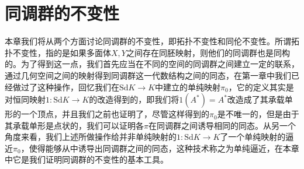 \chapter{同调群的不变性}
本章我们将从两个方面讨论同调群的不变性，即拓扑不变性和同伦不变性。所谓拓扑不变性，指的是如果多面体$X,Y$之间存在同胚映射，则他们的同调群也是同构的。为了得到这一点，我们首先应当在不同的空间的同调群之间建立一定的联系，通过几何空间之间的映射得到同调群这一代数结构之间的同态，在第一章中我们已经做过了这种操作，回忆我们在$\text{Sd}K\rightarrow K$中建立的单纯映射$\pi_{0}$，它的定义其实是对恒同映射$1:\text{Sd}K\rightarrow K$的改造得到的，即我们将$1(A^{*})=A^{*}$改造成了其承载单形的一个顶点，并且我们之前也证明了，尽管这样得到的$\pi_{0}$是不唯一的，但是由于其承载单形是点状的，我们可以证明各$\pi$在同调群之间诱导相同的同态。从另一个角度来看，我们上述所做操作给并非单纯映射的$1:\text{Sd}K\rightarrow K$了一个单纯映射的逼近$\pi_{0}$，使得能够从中诱导出同调群之间的同态，这种技术称之为单纯逼近，在本章中它是我们证明同调群的不变性的基本工具。
